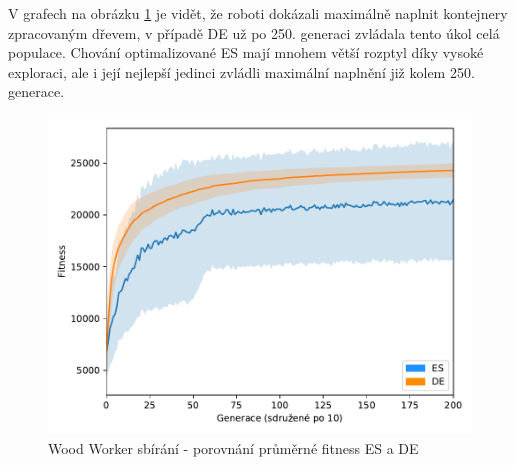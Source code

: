 	V grafech na obrázku \ref{obr04:PickupESvsDE} je vidět, že roboti dokázali maximálně naplnit kontejnery zpracovaným dřevem, v případě DE už po 250. generaci zvládala tento úkol celá populace. Chování optimalizované ES mají mnohem větší rozptyl díky vysoké exploraci, ale i její nejlepší jedinci zvládli maximální naplnění již kolem 250. generace. 
		   \begin{figure}[t]\centering       
		\includegraphics[width=\columnwidth]{../img/WoodMap/DEvsES/WorkerPickUpMem}
		\caption{Wood Worker sbírání - porovnání průměrné fitness ES a DE}
		\label{obr04:PickupESvsDE}
	\end{figure}
	\clearpage
